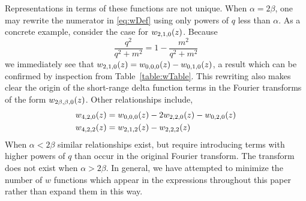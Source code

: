 Representations in terms of these functions are not unique. When $\alpha=2\beta$, one may rewrite the numerator in \eqref{eq:wDef} using only powers of $q$ less than $\alpha$. As a concrete example, consider the case for $w_{2,1,0}(z)$. Because
\begin{equation}
\frac{q^2}{q^2+m^2}=1-\frac{m^2}{q^2+m^2}
\end{equation}
we immediately see that $w_{2,1,0}(z)=w_{0,0,0}(z)-w_{0,1,0}(z)$, a result which can be confirmed by inspection from Table~\ref{table:wTable}. This rewriting also makes clear the origin of the short-range delta function terms in the Fourier transforms of the form $w_{2\beta,\beta,0}(z)$. Other relationships include,
\begin{align}
w_{4,2,0}(z)&=w_{0,0,0}(z)-2 w_{2,2,0}(z)-w_{0,2,0}(z) \\
w_{4,2,2}(z)&=w_{2,1,2}(z)-w_{2,2,2}(z)
\end{align}
When $\alpha < 2\beta$ similar relationships exist, but require introducing terms with higher powers of $q$ than occur in the original Fourier transform. The transform does not exist when $\alpha>2\beta$. In general, we have attempted to minimize the number of $w$ functions which appear in the expressions throughout this paper rather than expand them in this way.
